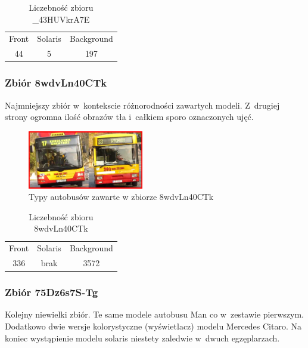 \begin{table}[!h]
    \centering
    \begin{tabular}{c|c|c}
        Front   & Solaris   & Background \\
        44      & 5         & 197 
    \end{tabular}
    \caption{Liczebność zbioru \_43HUVkrA7E}
    \label{tab:_43HUVkrA7E_count}
\end{table}

\subsubsection{Zbiór 8wdvLn40CTk}

Najmniejszy zbiór w~kontekscie różnorodności zawartych modeli. Z~drugiej
strony ogromna ilość obrazów tła i~całkiem sporo oznaczonych ujęć.

\begin{figure}[!h]
    \centering
    \includegraphics[width=0.45\textwidth]{img/exp_trainig_data_8wd}
    \caption{Typy autobusów zawarte w zbiorze 8wdvLn40CTk}
    \label{fig:8wdvLn40CTk_types}
\end{figure}

\begin{table}[!h]
    \centering
    \begin{tabular}{c|c|c}
        Front   & Solaris   & Background \\
        336     & brak      & 3572
    \end{tabular}
    \caption{Liczebność zbioru 8wdvLn40CTk}
    \label{tab:8wdvLn40CTk_count}
\end{table}

\subsubsection{Zbiór 75Dz6s7S-Tg}

Kolejny niewielki zbiór. Te same modele autobusu Man co w~zestawie
pierwszym. Dodatkowo dwie wersje kolorystyczne (wyświetlacz) modelu
Mercedes Citaro. Na koniec wystąpienie modelu solaris niestety zaledwie
w~dwuch egzęplarzach.

